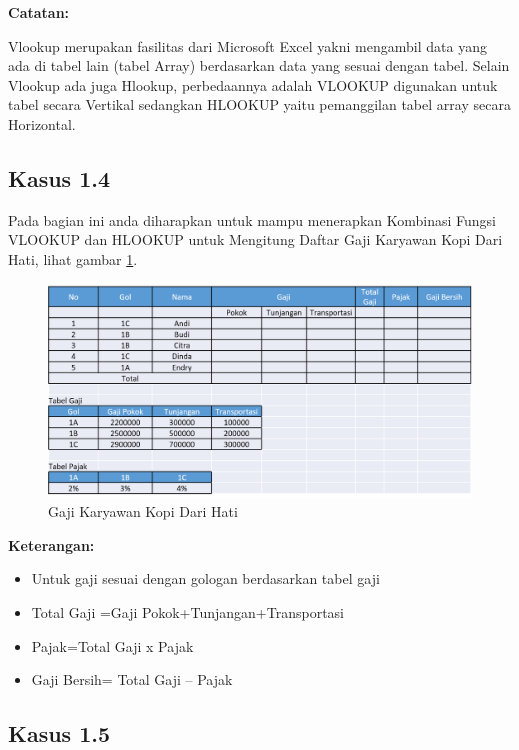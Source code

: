 \documentclass[
]{book}
\providecommand{\tightlist}{%
  \setlength{\itemsep}{0pt}\setlength{\parskip}{0pt}}
\begin{document}
\textbf{Catatan:}

Vlookup merupakan fasilitas dari Microsoft Excel yakni mengambil data yang ada di tabel lain (tabel Array) berdasarkan data yang sesuai dengan tabel. Selain Vlookup ada juga Hlookup, perbedaannya adalah VLOOKUP digunakan untuk tabel secara Vertikal sedangkan HLOOKUP yaitu pemanggilan tabel array secara Horizontal.

\hypertarget{kasus-1.4}{%
\subsection*{Kasus 1.4}\label{kasus-1.4}}

Pada bagian ini anda diharapkan untuk mampu menerapkan Kombinasi Fungsi VLOOKUP dan HLOOKUP untuk Mengitung Daftar Gaji Karyawan Kopi Dari Hati, lihat gambar \ref{fig:tabel4}.

\begin{figure}

{\centering \includegraphics[width=1\linewidth]{images/tabel4} 

}

\caption{Gaji Karyawan Kopi Dari Hati}\label{fig:tabel4}
\end{figure}

\textbf{Keterangan:}

\begin{itemize}
\tightlist
\item
  Untuk gaji sesuai dengan gologan berdasarkan tabel gaji
\item
  Total Gaji =Gaji Pokok+Tunjangan+Transportasi
\item
  Pajak=Total Gaji x Pajak
\item
  Gaji Bersih= Total Gaji -- Pajak
\end{itemize}

\hypertarget{kasus-1.5}{%
\subsection*{Kasus 1.5}\label{kasus-1.5}}
\end{document}

